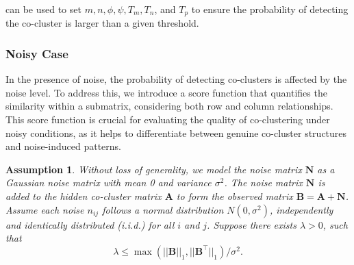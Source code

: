 \documentclass[journal]{IEEEtran}
\newtheorem{assumption}{Assumption}
\begin{document}
 can be used to set $m, n, \phi, \psi, T_m, T_n$, and $T_p$ to ensure the probability of detecting the co-cluster is larger than a given threshold.

\subsubsection{Noisy Case}
\label{subsubsec:noisy_case}

In the presence of noise, the probability of detecting co-clusters is affected by the noise level. To address this, we introduce a score function that quantifies the similarity within a submatrix, considering both row and column relationships. This score function is crucial for evaluating the quality of co-clustering under noisy conditions, as it helps to differentiate between genuine co-cluster structures and noise-induced patterns.

\begin{assumption}
  Without loss of generality, we model the noise matrix $\mathbf{N}$ as a Gaussian noise matrix with mean 0 and variance $\sigma^2$. The noise matrix $\mathbf{N}$ is added to the hidden co-cluster matrix $\mathbf{A}$ to form the observed matrix $\mathbf{B} = \mathbf{A} + \mathbf{N}$.
  Assume each noise $n_{ij}$ follows a normal distribution $N(0, \sigma^2)$, independently and identically distributed (i.i.d.) for all $i$ and $j$. Suppose there exists $\lambda > 0$, such that
  $$\lambda \le \max(||\mathbf{B}||_1, ||\mathbf{B}^\top||_1)/\sigma^2.$$
\end{assumption}
\end{document}
